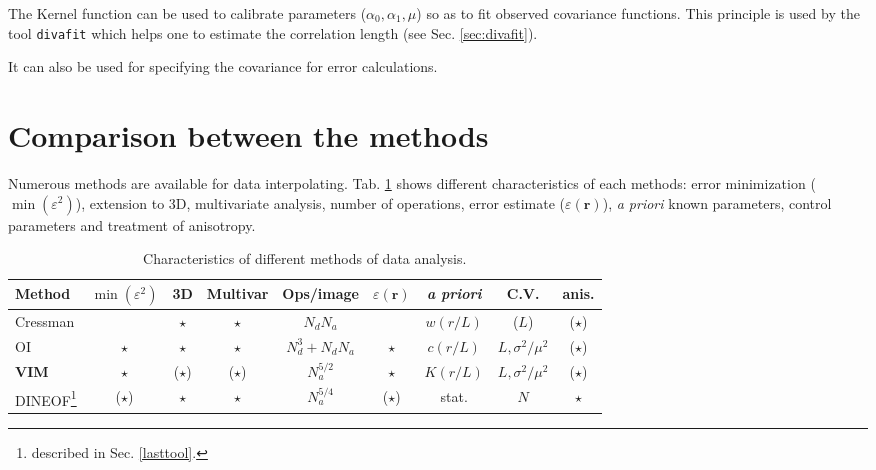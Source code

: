 The Kernel function can be used to calibrate \diva parameters ($\alpha_0, \alpha_1, \mu$) so as to fit observed covariance functions. This principle is used by the tool \texttt{divafit} which helps one to estimate the correlation length (see Sec. \ref{sec:divafit}).

It can also be used for specifying the covariance for error calculations.%



\section{Comparison between the methods}

Numerous methods are available for data interpolating. Tab. \ref{tabdata} shows different characteristics of each methods: error minimization ($\min( \varepsilon^2)$), extension to 3D, multivariate analysis, number of operations, error estimate ($\varepsilon(\mathbf{r})$), \textit{a priori} known parameters, control parameters and treatment of anisotropy. 


\begin{table}[htpb]
\begin{flushleft}
\caption{Characteristics of different methods of data analysis. \label{tabdata}}
\begin{tabular}{lcccccccc}
\hline
Method   & $\min( \varepsilon^2)$ & 3D       & Multivar & Ops/image        & $ \varepsilon(\mathbf{r})$& \textit{a priori}& C.V. & anis. \\ 
\hline
Cressman &                    & $\star$  &  $\star$ & $N_d N_a$        &                        & $w(r/L)$         &($L$) & ($\star$)  \\ 
OI     &   $\star$          & $\star$  &  $\star$ & $N_d^3+ N_d N_a$ &  $\star$               & $c(r/L)$         & $L,\sigma^2/\mu^2$&($\star$)\\ 
{\bf VIM}&   $\star$       & ($\star$)& ($\star$)& $N_a^{5/2}$      &  $\star$               & $K(r/L)$         & $L,\sigma^2/\mu^2$&($\star$)\\
DINEOF\footnote{described in Sec. \ref{lasttool}.}   &   ($\star$)        &  $\star$ &  $\star$ & $N_a^{5/4}$      &  ($\star$)   &  stat.          & $N$               & $\star$\\ 
\hline
\end{tabular}
\end{flushleft}
\end{table}
\clearpage

